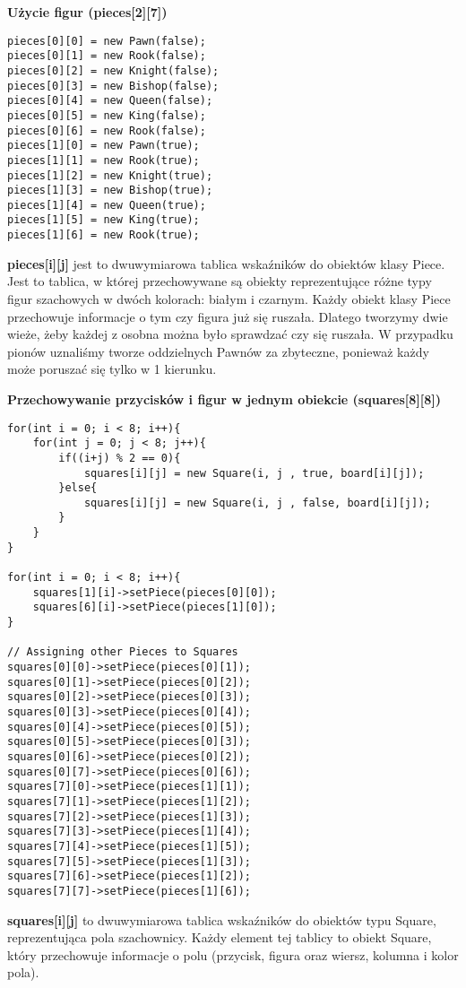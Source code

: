 \documentclass[]{report}
\begin{document}
\begin{flushleft}
\textbf{Użycie figur (pieces[2][7])}
\end{flushleft}
\begin{lstlisting}
pieces[0][0] = new Pawn(false);
pieces[0][1] = new Rook(false);
pieces[0][2] = new Knight(false);
pieces[0][3] = new Bishop(false);
pieces[0][4] = new Queen(false);
pieces[0][5] = new King(false);
pieces[0][6] = new Rook(false);
pieces[1][0] = new Pawn(true);
pieces[1][1] = new Rook(true);
pieces[1][2] = new Knight(true);
pieces[1][3] = new Bishop(true);
pieces[1][4] = new Queen(true);
pieces[1][5] = new King(true);
pieces[1][6] = new Rook(true);
\end{lstlisting}
\vspace{\baselineskip}
\textbf{pieces[i][j]} jest to dwuwymiarowa tablica wskaźników do obiektów klasy Piece. Jest to tablica, w której przechowywane są obiekty reprezentujące różne typy figur szachowych w dwóch kolorach: białym i czarnym. Każdy obiekt klasy Piece przechowuje informacje o tym czy figura już się ruszała. Dlatego tworzymy dwie wieże, żeby każdej z osobna można było sprawdzać czy się ruszała. W przypadku pionów uznaliśmy tworze oddzielnych Pawnów za zbyteczne, ponieważ każdy może poruszać się tylko w 1 kierunku.
\begin{flushleft}
\textbf{Przechowywanie przycisków i figur w jednym obiekcie (squares[8][8])}
\end{flushleft}
\begin{lstlisting}
for(int i = 0; i < 8; i++){
	for(int j = 0; j < 8; j++){
		if((i+j) % 2 == 0){
			squares[i][j] = new Square(i, j , true, board[i][j]);
		}else{
			squares[i][j] = new Square(i, j , false, board[i][j]);
		}
	}
}

for(int i = 0; i < 8; i++){
	squares[1][i]->setPiece(pieces[0][0]);
	squares[6][i]->setPiece(pieces[1][0]);
}

// Assigning other Pieces to Squares
squares[0][0]->setPiece(pieces[0][1]);
squares[0][1]->setPiece(pieces[0][2]);
squares[0][2]->setPiece(pieces[0][3]);
squares[0][3]->setPiece(pieces[0][4]);
squares[0][4]->setPiece(pieces[0][5]);
squares[0][5]->setPiece(pieces[0][3]);
squares[0][6]->setPiece(pieces[0][2]);
squares[0][7]->setPiece(pieces[0][6]);
squares[7][0]->setPiece(pieces[1][1]);
squares[7][1]->setPiece(pieces[1][2]);
squares[7][2]->setPiece(pieces[1][3]);
squares[7][3]->setPiece(pieces[1][4]);
squares[7][4]->setPiece(pieces[1][5]);
squares[7][5]->setPiece(pieces[1][3]);
squares[7][6]->setPiece(pieces[1][2]);
squares[7][7]->setPiece(pieces[1][6]);
\end{lstlisting}
\begin{flushleft}
\textbf{squares[i][j]} to dwuwymiarowa tablica wskaźników do obiektów typu Square, reprezentująca pola szachownicy. Każdy element tej tablicy to obiekt Square, który przechowuje informacje o polu (przycisk, figura oraz wiersz, kolumna i kolor pola).
\end{flushleft}
\end{document}
